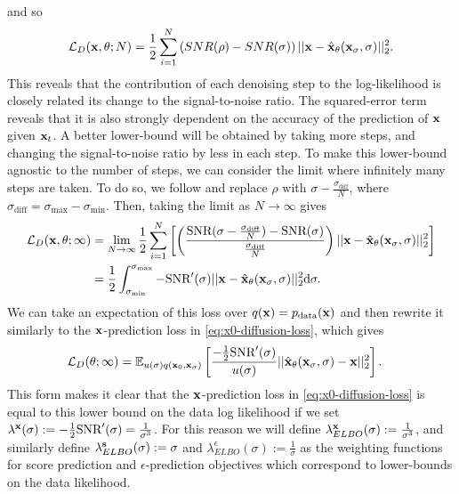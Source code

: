 and so
\begin{align}
    \mathcal{L}_D({\mathbf{x}}, \theta; N) = \frac{1}{2} \sum_{i=1}^N \left( SNR(\rho) - SNR(\sigma) \right) || {\mathbf{x}} - \hat{{\mathbf{x}}}_\theta({\mathbf{x}}_\sigma, \sigma) ||_2^2.
\end{align}
This reveals that the contribution of each denoising step to the log-likelihood is closely related its change to the signal-to-noise ratio. The squared-error term reveals that it is also strongly dependent on the accuracy of the prediction of ${\mathbf{x}}$ given ${\mathbf{x}}_t$. A better lower-bound will be obtained by taking more steps, and changing the signal-to-noise ratio by less in each step. To make this lower-bound agnostic to the number of steps, we can consider the limit where infinitely many steps are taken. To do so, we  follow \citet{kingma2021variational} and replace $\rho$ with $\sigma-\frac{\sigma_\text{diff}}{N}$, where $\sigma_\text{diff} = \sigma_\text{max}-\sigma_\text{min}$. Then, taking the limit as $N \rightarrow \infty$ gives 
\begin{align}
    \mathcal{L}_D({\mathbf{x}}, \theta; \infty) &= \lim_{N\rightarrow\infty} \frac{1}{2} \sum_{i=1}^N \left[ \left( \frac{\text{SNR}(\sigma-\frac{\sigma_\text{diff}}{N}) - \text{SNR}(\sigma)}{\frac{\sigma_\text{diff}}{N}} \right) || {\mathbf{x}} - \hat{{\mathbf{x}}}_\theta({\mathbf{x}}_\sigma, \sigma) ||_2^2 \right] \\
    &= \frac{1}{2} \int_{\sigma_\text{min}}^{\sigma_\text{max}} -\text{SNR}'(\sigma) || {\mathbf{x}} - \hat{{\mathbf{x}}}_\theta({\mathbf{x}}_\sigma, \sigma) ||_2^2 \mathrm{d}\sigma \label{eq:diffusion-elbo}.
\end{align}
We can take an expectation of this loss over $q({\mathbf{x}})=p_{\rm{data}}({\mathbf{x}})$ and then rewrite it similarly to the ${\mathbf{x}}$-prediction loss in \cref{eq:x0-diffusion-loss}, which gives
\begin{align} \label{eq:diffusion-loss-likelihood}
    \mathcal{L}_D(\theta; \infty) &= \mathbb{E}_{u(\sigma)q({\mathbf{x}}_0, {\mathbf{x}}_\sigma)} \left[ 
    \frac{-\frac{1}{2}\text{SNR}'(\sigma)}{u(\sigma)}
    || \hat{{\mathbf{x}}}_\theta({\mathbf{x}}_\sigma, \sigma) - {\mathbf{x}} ||_2^2 \right].
\end{align}
This form makes it clear that the ${\mathbf{x}}$-prediction loss in \cref{eq:x0-diffusion-loss} is equal to this lower bound on the data log likelihood if we set $\lambda^{\mathbf{x}}(\sigma) := - \frac{1}{2} \text{SNR}'(\sigma) = \frac{1}{\sigma^3}$. For this reason we will define $\lambda^{\mathbf{x}}_{ELBO}(\sigma) := \frac{1}{\sigma^3}$, and similarly define $\lambda^{\mathbf{s}}_{ELBO}(\sigma) := \sigma$ and $\lambda^\epsilon_{ELBO}(\sigma) := \frac{1}{\sigma}$ as the weighting functions for score prediction and $\epsilon$-prediction objectives which correspond to lower-bounds on the data likelihood.

